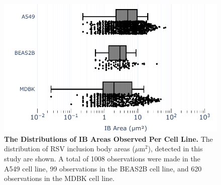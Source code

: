 \begin{figure}
    \centering
    \includegraphics[width=1\linewidth]{08. Chapter 3/Figs/01. Localisation introduction/06. box-infection.pdf}
    \caption[The Distributions of IB Areas Observed Per Cell Line.]{\textbf{The Distributions of IB Areas Observed Per Cell Line.} The distribution of RSV inclusion body areas (\(\mu \mbox{m}^2\)), detected in this study are shown. A total of 1008 observations were made in the A549 cell line, 99 observations in the BEAS2B cell line, and 620 observations in the MDBK cell line.}
    \label{fig:The Distributions of IB Areas Observed Per Cell Line}
\end{figure}

